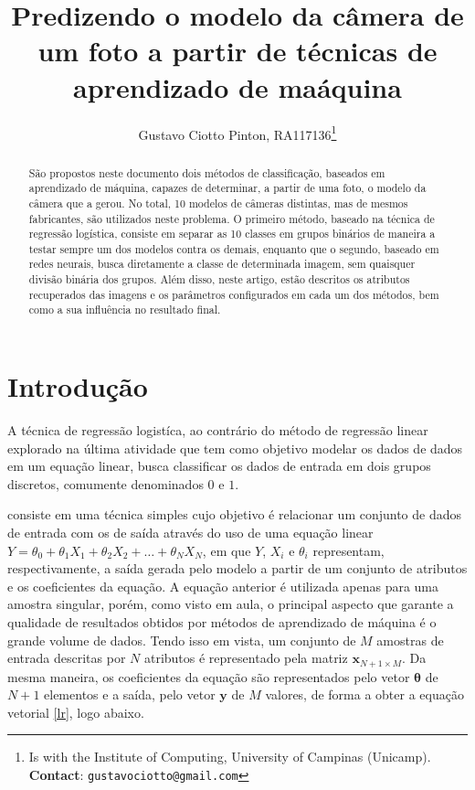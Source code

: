 \documentclass[10pt,twocolumn,letterpaper]{article}
\begin{document}
\title {Predizendo o modelo da câmera de um foto a partir de técnicas de aprendizado de maáquina}
\author{Gustavo Ciotto Pinton, RA117136\thanks{Is with the Institute of Computing, University of Campinas (Unicamp). \textbf{Contact}: \tt\small{gustavociotto@gmail.com}}}

\maketitle
\begin{abstract}
São propostos neste documento dois métodos de classificação, baseados em aprendizado de máquina, capazes de determinar, a partir de uma foto, o modelo da câmera que a gerou. No total, 10 modelos de câmeras distintas, mas de mesmos fabricantes, são utilizados neste problema. O primeiro método, baseado na técnica de regressão logística, consiste em separar as 10 classes em grupos binários de maneira a testar sempre um dos modelos contra os demais, enquanto que o segundo, baseado em redes neurais, busca diretamente a classe de determinada imagem, sem quaisquer divisão binária dos grupos. Além disso, neste artigo, estão descritos os atributos recuperados das imagens e os parâmetros configurados em cada um dos métodos, bem como a sua influência no resultado final.
\end{abstract}

\section{Introdução}
\label{intro}

A técnica de regressão logistíca, ao contrário do método de regressão linear explorado na última atividade que tem como objetivo modelar os dados de dados em um equação linear, busca classificar os dados de entrada em dois grupos discretos, comumente denominados \(0\) e \(1\). 

consiste em uma técnica simples cujo objetivo é relacionar um conjunto de dados de entrada com os de saída através do uso de uma equação linear \(Y = \theta_0 + \theta_1X_1 + \theta_2X_2 + \ldots + \theta_NX_N\), em que \(Y\), \(X_i\) e \(\theta_i\) representam, respectivamente, a saída gerada pelo modelo a partir de um conjunto de atributos e os coeficientes da equação. A equação anterior é utilizada apenas para uma amostra singular, porém, como visto em aula, o principal aspecto que garante a qualidade de resultados obtidos por métodos de aprendizado de máquina é o grande volume de dados. Tendo isso em vista, um conjunto de \(M\) amostras de entrada descritas por \(N\) atributos é representado pela matriz \(\bm{x}_{N+1\times M}\). Da mesma maneira, os coeficientes da equação são representados pelo vetor \(\bm{\theta}\) de \(N+1\) elementos e a saída, pelo vetor \(\bm{y}\) de \(M\) valores, de forma a obter a equação vetorial \ref{lr}, logo abaixo.
\end{document}
